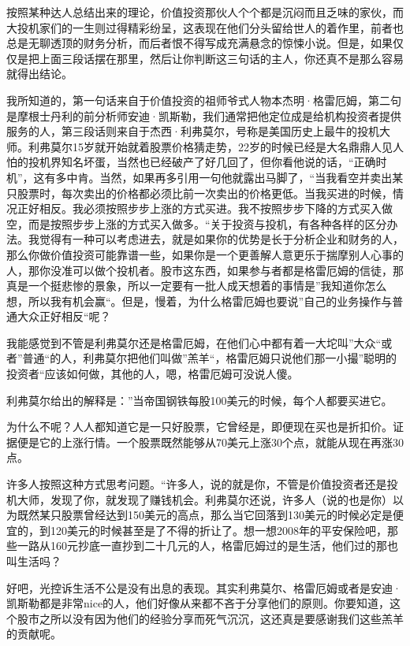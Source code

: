 按照某种达人总结出来的理论，价值投资那伙人个个都是沉闷而且乏味的家伙，而大投机家们的一生则过得精彩纷呈，这表现在他们分头留给世人的着作里，前者也总是无聊透顶的财务分析，而后者恨不得写成充满悬念的惊悚小说。但是，如果仅仅是把上面三段话摆在那里，然后让你判断这三句话的主人，你还真不是那么容易就得出结论。

我所知道的，第一句话来自于价值投资的祖师爷式人物本杰明·格雷厄姆，第二句是摩根士丹利的前分析师安迪·凯斯勒，我们通常把他定位成是给机构投资者提供服务的人，第三段话则来自于杰西·利弗莫尔，号称是美国历史上最牛的投机大师。利弗莫尔15岁就开始就着股票价格猜走势，22岁的时候已经是大名鼎鼎人见人怕的投机界知名坏蛋，当然也已经破产了好几回了，但你看他说的话，``正确时机''，这有多中肯。当然，如果再多引用一句他就露出马脚了，``当我看空并卖出某只股票时，每次卖出的价格都必须比前一次卖出的价格更低。当我买进的时候，情况正好相反。我必须按照步步上涨的方式买进。我不按照步步下降的方式买入做空，而是按照步步上涨的方式买入做多。``关于投资与投机，有各种各样的区分办法。我觉得有一种可以考虑进去，就是如果你的优势是长于分析企业和财务的人，那么你做价值投资可能靠谱一些，如果你是一个更善解人意更乐于揣摩别人心事的人，那你没准可以做个投机者。股市这东西，如果参与者都是格雷厄姆的信徒，那真是一个挺悲惨的景象，所以一定要有一批人成天想着的事情是''我知道你怎么想，所以我有机会赢``。但是，慢着，为什么格雷厄姆也要说''自己的业务操作与普通大众正好相反``呢？

我能感觉到不管是利弗莫尔还是格雷厄姆，在他们心中都有着一大坨叫''大众``或者''普通``的人，利弗莫尔把他们叫做''羔羊``，格雷厄姆只说他们那一小撮''聪明的投资者``应该如何做，其他的人，嗯，格雷厄姆可没说人傻。

利弗莫尔给出的解释是：''当帝国钢铁每股100美元的时候，每个人都要买进它。

为什么不呢？人人都知道它是一只好股票，它曾经是，即便现在买也是折扣价。证据便是它的上涨行情。一个股票既然能够从70美元上涨30个点，就能从现在再涨30点。

许多人按照这种方式思考问题。``许多人，说的就是你，不管是价值投资者还是投机大师，发现了你，就发现了赚钱机会。利弗莫尔还说，许多人（说的也是你）以为既然某只股票曾经达到150美元的高点，那么当它回落到130美元的时候必定是便宜的，到120美元的时候甚至是了不得的折让了。想一想2008年的平安保险吧，那些一路从160元抄底一直抄到二十几元的人，格雷厄姆过的是生活，他们过的那也叫生活吗？

好吧，光控诉生活不公是没有出息的表现。其实利弗莫尔、格雷厄姆或者是安迪·凯斯勒都是非常nice的人，他们好像从来都不吝于分享他们的原则。你要知道，这个股市之所以没有因为他们的经验分享而死气沉沉，这还真是要感谢我们这些羔羊的贡献呢。

